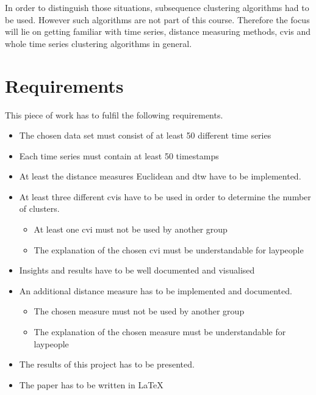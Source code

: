 In order to distinguish those situations, subsequence clustering algorithms had to be used. However such algorithms are not part of this course. Therefore the focus will lie on getting familiar with time series, distance measuring methods, \acp{cvi} and whole time series clustering algorithms in general.


\clearpage
\section{Requirements}

This piece of work has to fulfil the following requirements.

\begin{itemize}
  \item The chosen data set must consist of at least 50 different time series
  \item Each time series must contain at least 50 timestamps
  \item At least the distance measures Euclidean and \ac{dtw} have to be implemented.
  \item At least three different \acp{cvi} have to be used in order to determine the number of clusters.
  \begin{itemize}
  	\item At least one \ac{cvi} must not be used by another group
  	\item The explanation of the chosen \ac{cvi} must be understandable for laypeople
  \end{itemize}
  \item Insights and results have to be well documented and visualised
  \item An additional distance measure has to be implemented and documented.
  \begin{itemize}
  	\item The chosen measure must not be used by another group
  	\item The explanation of the chosen measure must be understandable for laypeople
  \end{itemize}
  \item The results of this project has to be presented.
  \item The paper has to be written in LaTeX
  
\end{itemize}

